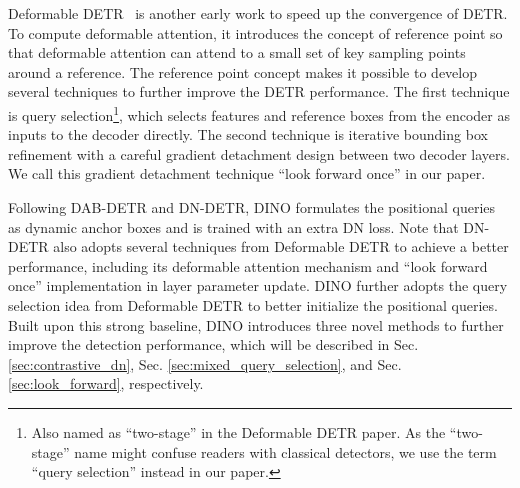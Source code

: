 \documentclass[runningheads]{llncs}
\newcommand{\modelname}{{DINO}}
\begin{document}
Deformable DETR~\cite{zhu2020deformable} is another early work to speed up the convergence of DETR. To compute deformable attention, it introduces the concept of reference point so that deformable attention can attend to a small set of key sampling points around a reference. The reference point concept makes it possible to develop several techniques to further improve the DETR performance. The first technique is query selection\footnote{Also named as ``two-stage'' in the Deformable DETR paper. As the ``two-stage'' name might confuse readers with classical detectors, we use the term ``query selection'' instead in our paper.}, which selects features and reference boxes from the encoder as inputs to the decoder directly. The second technique is iterative bounding box refinement with a careful gradient detachment design between two decoder layers. We call this gradient detachment technique ``look forward once'' in our paper. 

Following DAB-DETR and DN-DETR, {\modelname} formulates the positional queries as dynamic anchor boxes and is trained with an extra DN loss. Note that DN-DETR
also adopts several techniques from Deformable DETR to achieve a better performance, including its deformable attention mechanism and ``look forward once'' implementation in layer parameter update. DINO further adopts the query selection idea from Deformable DETR to better initialize the positional queries. Built upon this strong baseline, {\modelname} introduces three novel methods to further improve the detection performance, which will be described in Sec. \ref{sec:contrastive_dn}, Sec. \ref{sec:mixed_query_selection}, and Sec. \ref{sec:look_forward}, respectively.
\end{document}
